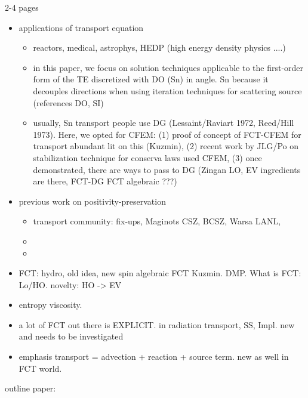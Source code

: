 2-4 pages
\begin{itemize}
\item applications of transport equation
\begin{itemize}
\item reactors, medical, astrophys, HEDP (high energy density physics ....)
\item  in this paper, we focus on solution techniques applicable to the first-order form of the TE discretized with DO (Sn) in angle. Sn because it decouples directions when using iteration techniques for scattering source (references DO, SI)
\item usually, Sn transport people use DG (Lessaint/Raviart 1972, Reed/Hill 1973). Here, we opted for CFEM: (1) proof of concept of FCT-CFEM for transport abundant lit on this (Kuzmin), (2) recent work by JLG/Po on stabilization technique for conserva laws used CFEM, (3) once demonstrated, there are ways to pass to DG (Zingan LO, EV ingredients are there, FCT-DG  FCT algebraic ???)
\end{itemize}

\item previous work on positivity-preservation
\begin{itemize}
\item transport community: fix-ups, Maginots CSZ, BCSZ, Warsa LANL, 
\item 
\item 
\end{itemize}
\item FCT: hydro, old idea, new spin algebraic FCT Kuzmin. DMP. What is FCT: Lo/HO. novelty: HO -> EV
\item entropy viscosity.
\item a lot of FCT out there is EXPLICIT. in radiation transport, SS, Impl. new and needs to be investigated
\item emphasis transport = advection + reaction + source term. new as well in FCT world.
\end{itemize}


outline paper: